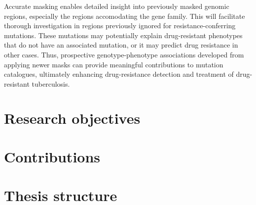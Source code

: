 Accurate masking enables detailed insight into previously masked genomic regions, especially the regions accomodating the \ppe gene family. This will facilitate thorough investigation in regions previously ignored for resistance-conferring mutations. These mutations may potentially explain drug-resistant phenotypes that do not have an associated mutation, or it may predict drug resistance in other cases. Thus, prospective genotype-phenotype associations developed from applying newer masks can provide meaningful contributions to mutation catalogues, ultimately enhancing drug-resistance detection and treatment of drug-resistant tuberculosis.  

\section{Research objectives}\label{intro:sec:objectives}

\section{Contributions}\label{intro:sec:contributions}

\section{Thesis structure}\label{intro:sec:structure}
